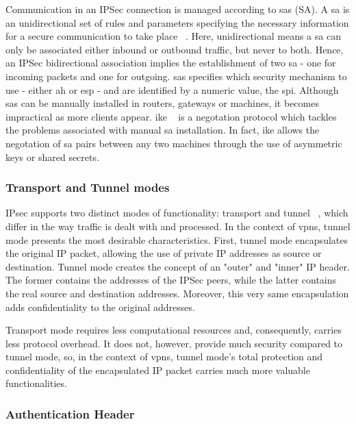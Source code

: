 \documentclass[11pt,twoside,a4paper]{report}
\begin{document}
Communication in an IPSec connection is managed according to \acrlong{sa}s (SA). A \acrshort{sa} is an unidirectional set of rules and parameters specifying the necessary information for a secure communication to take place ~\cite{rfc4301}. Here, unidirectional means a \acrshort{sa} can only be associated either inbound or outbound traffic, but never to both. Hence, an IPSec bidirectional association implies the establishment of two \acrshort{sa} - one for incoming packets and one for outgoing. \acrshort{sa}s specifies which security mechanism to use - either \acrfull{ah} or \acrfull{esp} - and are identified by a numeric value, the \acrfull{spi}. Although \acrshort{sa}s can be manually installed in routers, gateways or machines, it becomes impractical as more clients appear. \acrfull{ike} ~\cite{rfc7296} is a negotation protocol which tackles the problems associated with manual \acrshort{sa} installation. In fact, \acrshort{ike} allows the negotation of \acrshort{sa} pairs between any two machines through the use of asymmetric keys or shared secrets.

\subsubsection{Transport and Tunnel modes}

IPsec supports two distinct modes of functionality: transport and tunnel ~\cite{rfc4301}, which differ in the way traffic is dealt with and processed. In the context of \acrshort{vpn}s, tunnel mode presents the
most desirable characteristics. First, tunnel mode encapsulates the original IP packet, allowing the use of private IP addresses as source or destination. Tunnel mode creates the concept of an "outer" and "inner" IP header. The former contains the addresses of the IPSec peers, while the latter contains the real source and destination addresses. Moreover, this very same encapsulation adds confidentiality to the original addresses.

Transport mode requires less computational resources and, consequently, carries less protocol overhead. It does not, however, provide much security compared to tunnel mode, so, in the context of \acrshort{vpn}s, tunnel mode's total protection and confidentiality of the encapsulated IP packet carries much more valuable functionalities.

\subsubsection{Authentication Header}
\end{document}
